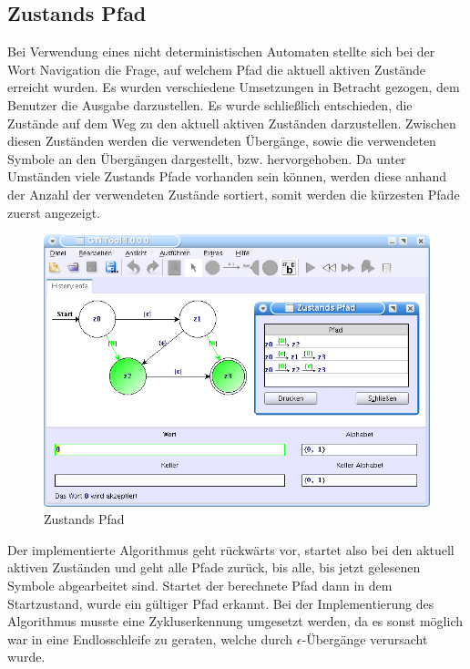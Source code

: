 \subsection{Zustands Pfad}

Bei Verwendung eines nicht deterministischen Automaten stellte sich bei der
Wort Navigation die Frage, auf welchem Pfad die aktuell aktiven Zustände
erreicht wurden. Es wurden verschiedene Umsetzungen in Betracht gezogen, dem
Benutzer die Ausgabe darzustellen. Es wurde schließlich entschieden, die
Zustände auf dem Weg zu den aktuell aktiven Zuständen darzustellen. Zwischen
diesen Zuständen werden die verwendeten Übergänge, sowie die verwendeten
Symbole an den Übergängen dargestellt, bzw. hervorgehoben. Da unter Umständen
viele Zustands Pfade vorhanden sein können, werden diese anhand der Anzahl der
verwendeten Zustände sortiert, somit werden die kürzesten Pfade zuerst
angezeigt.\vspace{10pt}

\begin{figure}[h!]
\begin{center}
\includegraphics[width=12cm]{../images/history_path.png}
\caption{Zustands Pfad}
\end{center}
\end{figure}

Der implementierte Algorithmus geht rückwärts vor, startet also bei den aktuell
aktiven Zuständen und geht alle Pfade zurück, bis alle, bis jetzt gelesenen
Symbole abgearbeitet sind. Startet der berechnete Pfad dann in dem
Startzustand, wurde ein gültiger Pfad erkannt. Bei der Implementierung des
Algorithmus musste eine Zykluserkennung umgesetzt werden, da es sonst möglich
war in eine Endlosschleife zu geraten, welche durch $\epsilon$-Übergänge
verursacht wurde.


